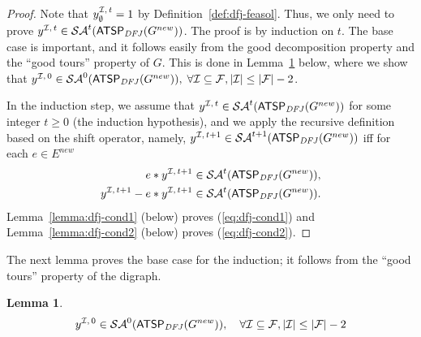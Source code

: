 \documentclass[11pt]{article}
\newtheorem{lemma}[theorem]{Lemma}
\newcommand{\atspdfj}{\homog{\textsf{ATSP$_{\mathit{DFJ}}$}}}
\newcommand{\fracset}{\mathcal{F}}
\newcommand{\sgn}{\mathcal{I}}
\newcommand{\saop}{\mathcal{SA}}
\newcommand{\homog}[1]{{#1}}
\begin{document}
\begin{proof}
Note that $\zvec{\sgn}{t}_\emptyset=1$ by Definition~\ref{def:dfj-feasol}.
Thus, we only need to prove $\zvec{\sgn}{t} \in \saop^t(\homog{\atspdfj(G^{new})})$.
The proof is by induction on $t$.
The base case is important, and it follows easily from the
good decomposition property and the ``good tours'' property of $G$.
This is done in Lemma~\ref{lemma:dfj-basecase} below, where we show that
$\zvec{\sgn}{0} \in \saop^0(\atspdfj(G^{new})),
	\;\forall \sgn\subseteq\fracset, |\sgn|\le |\fracset|-2$.

In the induction step, we assume that
$\zvec{\sgn}{t} \in \saop^t(\atspdfj(G^{new}))$ for some integer $t\ge0$
(the induction hypothesis),
and we apply the recursive definition based
on the shift operator, namely,
$\zvec{\sgn}{t+1} \in \saop^{t+1}(\atspdfj(G^{new}))$ iff for each $e\in E^{new}$
\begin{align}
 e * \zvec{\sgn}{t+1} \in \saop^{t}(\atspdfj(G^{new})), \label{eq:dfj-cond1} \\
 \zvec{\sgn}{t+1} - e*\zvec{\sgn}{t+1} \in \saop^{t}(\atspdfj(G^{new})).  \label{eq:dfj-cond2}
\end{align}
Lemma~\ref{lemma:dfj-cond1} (below) proves (\ref{eq:dfj-cond1}) and
Lemma~\ref{lemma:dfj-cond2} (below) proves (\ref{eq:dfj-cond2}).
\end{proof}

The next lemma proves the base case for the induction;
it follows from the ``good tours'' property of the digraph.

\begin{lemma} \label{lemma:dfj-basecase}
\[
	\zvec{\sgn}{0} \in \saop^{0}(\atspdfj(G^{new})), \quad
	\forall \sgn\subseteq\fracset, |\sgn|\le |\fracset|-2
\]
\end{lemma}
\end{document}
